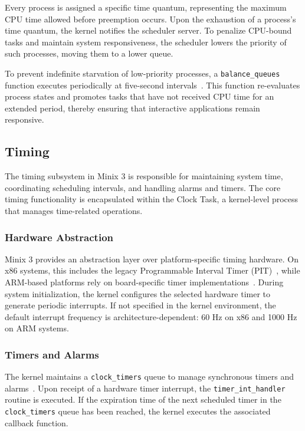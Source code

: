 \documentclass[a4paper,10pt,twoside]{report}
\theoremstyle{definition}
\begin{document}
Every process is assigned a specific time quantum, representing the maximum CPU time allowed before preemption occurs. Upon the exhaustion of a process's time quantum, the kernel notifies the scheduler server. To penalize CPU-bound tasks and maintain system responsiveness, the scheduler lowers the priority of such processes, moving them to a lower queue.

To prevent indefinite starvation of low-priority processes, a \texttt{balance\_queues} function executes periodically at five-second intervals~\cite{minix_sched_bq}. This function re-evaluates process states and promotes tasks that have not received CPU time for an extended period, thereby ensuring that interactive applications remain responsive.

\subsection{Timing}
The timing subsystem in Minix 3 is responsible for maintaining system time, coordinating scheduling intervals, and handling alarms and timers. The core timing functionality is encapsulated within the Clock Task, a kernel-level process that manages time-related operations.

\subsubsection{Hardware Abstraction}
Minix 3 provides an abstraction layer over platform-specific timing hardware. On x86 systems, this includes the legacy Programmable Interval Timer (PIT)~\cite{osdev-pit}, while ARM-based platforms rely on board-specific timer implementations~\cite{minix_arch_clock}. During system initialization, the kernel configures the selected hardware timer to generate periodic interrupts. If not specified in the kernel environment, the default interrupt frequency is architecture-dependent: 60 Hz on x86 and 1000 Hz on ARM systems.

\subsubsection{Timers and Alarms}
The kernel maintains a \texttt{clock\_timers} queue to manage synchronous timers and alarms~\cite{minix_kernel_clock}. Upon receipt of a hardware timer interrupt, the \texttt{timer\_int\_handler} routine is executed. If the expiration time of the next scheduled timer in the \texttt{clock\_timers} queue has been reached, the kernel executes the associated callback function. 
\end{document}

